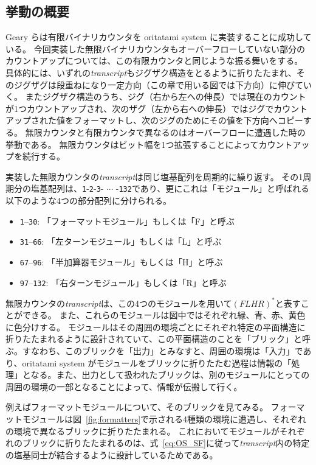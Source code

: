 \documentclass[a4j,11pt]{article}
\begin{document}
\subsection{挙動の概要}
Geary らは有限バイナリカウンタを oritatami system に実装することに成功している\cite{GeMeScSe2019}。
今回実装した無限バイナリカウンタもオーバーフローしていない部分のカウントアップについては、この有限カウンタと同じような振る舞いをする。
具体的には、いずれの\textit{transcript}もジグザク構造をとるように折りたたまれ、そのジグザグは段重ねになり一定方向（この章で用いる図では下方向）に伸びていく。
またジグザク構造のうち、ジグ（右から左への伸長）では現在のカウントが1つカウントアップされ、次のザグ（左から右への伸長）ではジグでカウントアップされた値をフォーマットし、次のジグのためにその値を下方向へコピーする。
無限カウンタと有限カウンタで異なるのはオーバーフローに遭遇した時の挙動である。
無限カウンタはビット幅を1つ拡張することによってカウントアップを続行する。

実装した無限カウンタの\textit{transcript}は同じ塩基配列を周期的に繰り返す。
その1周期分の塩基配列は、\texttt{1}-\texttt{2}-\texttt{3}- $\cdots$ -\texttt{132}であり、更にこれは「モジュール」と呼ばれる以下のような4つの部分配列に分けられる。

\begin{itemize}
\item \texttt{1}--\texttt{30}: 「フォーマットモジュール」もしくは「F」と呼ぶ
\item \texttt{31}--\texttt{66}: 「左ターンモジュール」もしくは「L」と呼ぶ
\item \texttt{67}--\texttt{96}: 「半加算器モジュール」もしくは「H」と呼ぶ
\item \texttt{97}--\texttt{132}: 「右ターンモジュール」もしくは「R」と呼ぶ
\end{itemize}

無限カウンタの\textit{transcript}は、この4つのモジュールを用いて$(FLHR)^*$と表すことができる。
また、これらのモジュールは図中ではそれぞれ緑、青、赤、黄色に色分けする。
モジュールはその周囲の環境ごとにそれぞれ特定の平面構造に折りたたまれるように設計されていて、この平面構造のことを「ブリック」と呼ぶ。すなわち、このブリックを「出力」とみなすと、周囲の環境は「入力」であり、oritatami system がモジュールをブリックに折りたたむ過程は情報の「処理」となる。また、出力として扱われたブリックは、別のモジュールにとっての周囲の環境の一部となることによって、情報が伝搬して行く。

例えばフォーマットモジュールについて、そのブリックを見てみる。
フォーマットモジュールは図~\ref{fig:formatters}で示される4種類の環境に遭遇し、それぞれの環境で異なるブリックに折りたたまれる。
これにおいてモジュールがそれぞれのブリックに折りたたまれるのは、式~\eqref{eq:OS_SF}に従って\textit{transcript}内の特定の塩基同士が結合するように設計しているためである。
\end{document}
